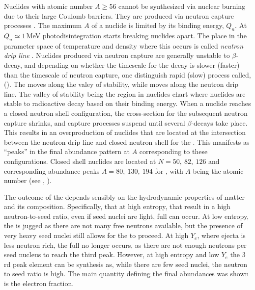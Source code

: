 Nuclides with atomic number  $A\geq 56$ cannot be synthesized via nuclear burning 
due to their large Coulomb barriers. They are produced via 
neutron capture processes \citep{Burbidge:1957}.
The maximum $A$ of a nuclide is limited by its binding energy, $Q_n$. 
At $Q_n \simeq1 \,$MeV photodisintegration starts breaking nuclides apart. 
The place in the parameter space of temperature and density where this occurs 
is called \textit{neutron drip line} \citep{Rolfs:1988}.
Nuclides produced via neutron capture are generally unstable to $\beta$-decay,
and depending on whether the timescale for the decay is slower (faster) than 
the timescale of neutron capture, one distinguish rapid (slow) process called,
\rproc{} (\sproc{}).
%
The \sproc{} moves along the valey of stability, while \rproc{} moves along the 
neutron drip line. The valley of stability being the region in nuclides chart 
where nuclides are stable to radioactive decay based on their binding energy. 
%
When a nuclide reaches a closed neutron shell configuration, the cross-section 
for the subsequent neutron capture shrinks, and capture processes suspend until 
several $\beta$-decays take place. This results in an overproduction of nuclides 
that are located at the intersection between the neutron drip line and closed 
neutron shell for the \rproc{}. This manifests as ``peaks'' in the final abundance 
pattern at $A$ corresponding to these configurations.
Closed shell nuclides are located at $N=50,\: 82, \: 126$ and 
corresponding abundance peaks $A=80,\:130,\:194$ for \rproc{}, 
with $A$ being the atomic number (see \eg, \citet{Arnould:2007gh}).

The outcome of the \rproc{} \nuc{} depends sensibly on the hydrodynamic properties 
of matter and its composition. 
%
Specifically, that at high entropy, that result in a high neutron-to-seed ratio, 
even if seed nuclei are light, full \rproc{} can occur.
At low entropy, the \rproc{} is jugged as there are not many free neutrons available,
but the presence of very heavy seed nuclei still allows for the \nuc{} to proceed. 
At high $Y_e$, where ejecta is less neutron rich, the full \rproc{} no longer occurs,  
as there are not enough neutrons per seed nucleus to reach the third peak.
However, at high entropy and low $Y_e$ the $3$rd peak element can be synthesis as, while 
there are few seed nuclei, the neutron to seed ratio is high.
%
The main quantity defining the final abundances was shown is the electron fraction.

